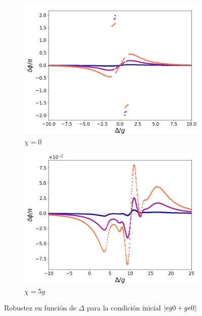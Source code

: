 \begin{figure}[h]
    \centering
    \begin{subfigure}{0.49\textwidth}
        \includegraphics[width=\textwidth]{figuras/ch5/robustez/delta/eg1+ge1 k=0.0g x=0.0g J=0.0g.png}
        \caption{$\chi=0$}
        \label{fig5:robustez detunning 1 eg0}
    \end{subfigure}
    \hfill
    \begin{subfigure}{0.49\textwidth}
        \includegraphics[width=\textwidth]{figuras/ch5/robustez/delta/eg1+ge1 k=0.0g x=5.0g J=0.0g.png}
        \caption{$\chi=5g$}
        \label{fig5:robustez detunning 2 eg0}
    \end{subfigure}
    \vfill

    \caption{Robustez en función de $\Delta$ para la condición inicial $\ket{eg0+ge0}$}
    \label{fig5:robustez detunning eg0}
\end{figure}

